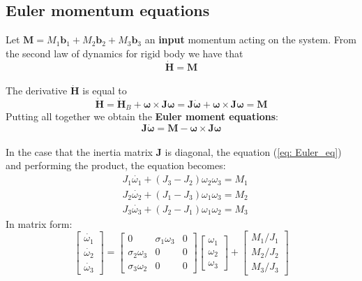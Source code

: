 \subsection{Euler momentum equations}
Let $\mathbf{M}=M_1\mathbf{b}_1+M_2\mathbf{b}_2+M_3\mathbf{b}_3$ an \textbf{input} momentum acting on the system. From the second law of dynamics for rigid body we have that
{\large{
    \begin{equation}
        \dot{\mathbf{H}}=\mathbf{M}
    \end{equation}
}}\\
The derivative $\dot{\mathbf{H}}$ is equal to
\begin{equation*}
    \dot{\mathbf{H}} = \dot{\mathbf{H}}_B + \boldsymbol{\omega} \times \mathbf{J}\boldsymbol{\omega} = 
    \mathbf{J}\dot{\boldsymbol{\omega}} + \mathbf{\omega} \times \mathbf{J}\boldsymbol{\omega}=\mathbf{M}
\end{equation*}
Putting all together we obtain the \textbf{Euler moment equations}:
{\Large{
    \begin{equation} \label{eq: Euler_eq}
        \mathbf{J}\dot{\boldsymbol{\omega}} = 
        \mathbf{M} - \boldsymbol{\omega}\times\boldsymbol{J\omega}
    \end{equation}
}}\\

\noindent
In the case that the inertia matrix $\mathbf{J}$ is diagonal, the equation (\ref{eq: Euler_eq}) and performing the product, the equation becomes: 
\begin{equation*}
    \begin{aligned}
        &J_1\dot{\omega_1}+(J_3-J_2)\omega_2\omega_3=M_1\\
        &J_2\dot{\omega_2}+(J_1-J_3){\omega_1\omega_3}=M_2\\
        &J_3\dot{\omega_3}+(J_2-J_1){\omega_1\omega_2}=M_3
    \end{aligned}
\end{equation*}
In matrix form:
\begin{equation}
    \begin{bmatrix}
        \dot{\omega_1}\\
        \dot{\omega_2}\\
        \dot{\omega_3}
    \end{bmatrix} = \begin{bmatrix}
        0&\sigma_1\omega_3&0\\
        \sigma_2\omega_3&0&0\\
        \sigma_3\omega_2&0&0
    \end{bmatrix} \begin{bmatrix}
        \omega_1\\\omega_2\\\omega_3
    \end{bmatrix} + 
    \begin{bmatrix}
        M_1/J_1\\
        M_2/J_2\\
        M_3/J_3
    \end{bmatrix}
\end{equation}

